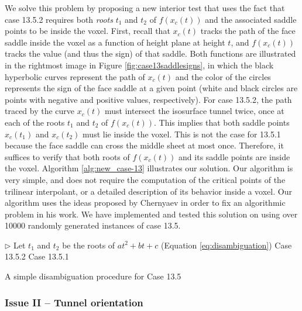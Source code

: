 We solve this problem by proposing a new interior test that uses the fact that case 13.5.2 requires both \emph{roots} $t_1$ and $t_2$ of $f(x_c(t))$ and the associated saddle points to be inside the voxel. 
%
First, recall that $x_c(t)$ tracks the path of the face saddle inside the voxel as a function of height plane at height $t$, and $f(x_c(t))$ tracks the value (and thus the sign) of that saddle. Both functions are illustrated in the rightmost image in Figure \ref{fig:case13saddlesigns}, in which the black hyperbolic curves represent the path of $x_c(t)$ and the color of the circles represents the sign of the face saddle at a given point (white and black circles are points with negative and positive values, respectively).
%
For case 13.5.2, the path traced by the curve $x_c(t)$ must intersect the isosurface tunnel twice, once at each of the roots $t_1$ and $t_2$ of $f(x_c(t))$. 
%
This implies that both saddle points $x_c(t_1)$ and $x_c(t_2)$ must lie inside the voxel. This is not the case for 13.5.1 because the face saddle can cross the middle sheet at most once. Therefore, it suffices to verify that both roots of $f(x_c(t))$ and its saddle points are inside the voxel. Algorithm \ref{alg:new_case-13} illustrates our solution. Our algorithm is very simple, and does not require the computation of the critical points of the trilinear interpolant, or a detailed description of its behavior inside a voxel. Our algorithm uses the ideas proposed by Chernyaev in order to fix an algorithmic problem in his work.
%
We have implemented and tested this solution on \cmc{} using over 10000 randomly generated instances of case 13.5.

\begin{algorithm}[b]
\begin{codebox}
\zi $\rhd$ Let $t_1$ and $t_2$ be the roots of $a t^2 + b t + c$ (Equation \eqref{eq:disambiguation})
\li {} 
\li	\Then \Return Case 13.5.2
\li	 \Else \Return  Case 13.5.1
\End
\end{codebox}
\caption{\label{alg:new_case-13}A simple disambiguation procedure for Case 13.5}
\end{algorithm}

\subsubsection{Issue II -- Tunnel orientation}
\label{sec:TunnelOrientation}

